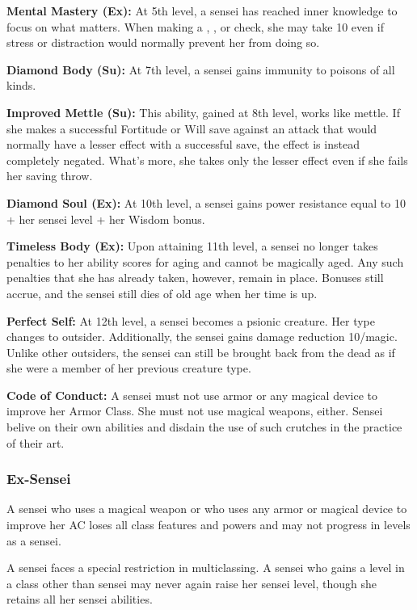 {\textbf{Mental Mastery (Ex):} At 5th level, a sensei has reached inner knowledge to focus on what matters. When making a , , or  check, she may take 10 even if stress or distraction would normally prevent her from doing so.

\textbf{Diamond Body (Su):} At 7th level, a sensei gains immunity to poisons of all kinds.

\textbf{Improved Mettle (Su):} This ability, gained at 8th level, works like mettle. If she makes a successful Fortitude or Will save against an attack that would normally have a lesser effect with a successful save, the effect is instead completely negated. What's more, she takes only the lesser effect even if she fails her saving throw.

\textbf{Diamond Soul (Ex):} At 10th level, a sensei gains power resistance equal to 10 + her sensei level + her Wisdom bonus.

\textbf{Timeless Body (Ex):} Upon attaining 11th level, a sensei no longer takes penalties to her ability scores for aging and cannot be magically aged. Any such penalties that she has already taken, however, remain in place. Bonuses still accrue, and the sensei still dies of old age when her time is up.

\textbf{Perfect Self:} At 12th level, a sensei becomes a psionic creature. Her type changes to outsider. Additionally, the sensei gains damage reduction 10/magic. Unlike other outsiders, the sensei can still be brought back from the dead as if she were a member of her previous creature type.

\textbf{Code of Conduct:} A sensei must not use armor or any magical device to improve her Armor Class. She must not use magical weapons, either. Sensei belive on their own abilities and disdain the use of such crutches in the practice of their art.

\subsubsection{Ex-Sensei}
A sensei who uses a magical weapon or who uses any armor or magical device to improve her AC loses all class features and powers and may not progress in levels as a sensei. %

A sensei faces a special restriction in multiclassing. A sensei who gains a level in a class other than sensei may never again raise her sensei level, though she retains all her sensei abilities.
}
